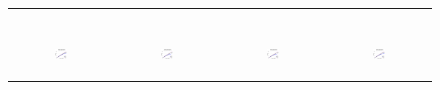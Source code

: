 \begin{figure}[ht]
\begin{tabular}{cccc}
\begin{subfigure}[b]{0.22\textwidth}
			\caption{}
			\label{appfig:partition:runtime_it2004_maxgraphcut}
	  \end{subfigure} \\
	  \begin{subfigure}[b]{0.22\textwidth}
	  	\includegraphics[width=110pt]{images_partition/speedup_friendster_maxgraphcut.pdf}
			\caption{}
			\label{appfig:partition:speedup_friendster_maxgraphcut}
	  \end{subfigure} &
	  \begin{subfigure}[b]{0.22\textwidth}
	  	\includegraphics[width=110pt]{images_partition/speedup_arabic2005_maxgraphcut.pdf}
			\caption{}
			\label{appfig:partition:speedup_arabic2005_maxgraphcut}
	  \end{subfigure} &
	  \begin{subfigure}[b]{0.22\textwidth}
	  	\includegraphics[width=110pt]{images_partition/speedup_uk2005_maxgraphcut.pdf}
			\caption{}
			\label{appfig:partition:speedup_uk2005_maxgraphcut}
	  \end{subfigure} &
	  \begin{subfigure}[b]{0.22\textwidth}
	  	\includegraphics[width=110pt]{images_partition/speedup_it2004_maxgraphcut.pdf}

\end{subfigure}
\end{tabular}
\end{figure}
